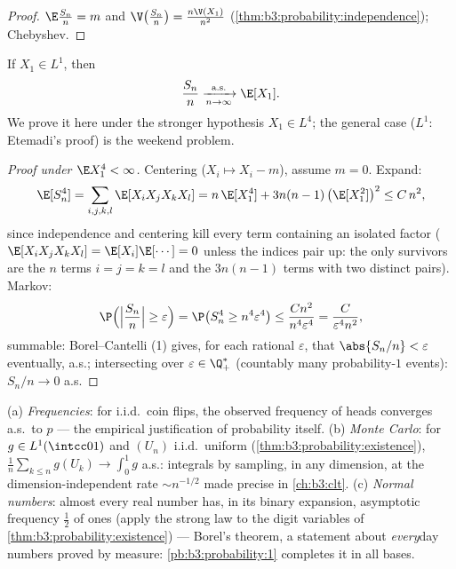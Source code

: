 \begin{proof}
$\E\frac{S_n}n = m$ and $\V\bigl(\frac{S_n}n\bigr) =
\frac{n\V(X_1)}{n^2}$
(\cref{thm:b3:probability:independence}); Chebyshev.
\end{proof}

\begin{theorem}
\label{thm:b3:probability:slln}
If $X_1 \in L^1$, then
\[
\frac{S_n}{n} \xrightarrow[n\to\infty]{\text{a.s.}} \E[X_1].
\]
We prove it here under the stronger hypothesis $X_1 \in
L^4$; the general case ($L^1$: Etemadi's proof) is the
weekend problem.
\end{theorem}

\begin{proof}[Proof under $\E X_1^4 < \infty$]
Centering ($X_i \mapsto X_i - m$), assume $m = 0$. Expand:
\[
\E[S_n^4] = \sum_{i,j,k,l}\E[X_iX_jX_kX_l]
= n\,\E[X_1^4] + 3n(n-1)\,\bigl(\E[X_1^2]\bigr)^2 \leq
C\,n^2 ,
\]
since independence and centering kill every term containing
an isolated factor ($\E[X_iX_jX_kX_l] =
\E[X_i]\E[\cdots] = 0$ unless the indices pair up: the only
survivors are the $n$ terms $i=j=k=l$ and the $3n(n-1)$
terms with two distinct pairs). Markov:
\[
\P\Bigl(\Bigl|\frac{S_n}n\Bigr| \geq \varepsilon\Bigr)
= \P\bigl(S_n^4 \geq n^4\varepsilon^4\bigr)
\leq \frac{Cn^2}{n^4\varepsilon^4} =
\frac{C}{\varepsilon^4n^2},
\]
summable: Borel--Cantelli (1) gives, for each rational
$\varepsilon$, that $\abs{S_n/n} < \varepsilon$ eventually,
a.s.; intersecting over $\varepsilon \in \Q_+^*$ (countably
many probability-$1$ events): $S_n/n \to 0$ a.s.
\end{proof}

\begin{example}
\label{ex:b3:probability:sllnapps}
(a) \emph{Frequencies}: for i.i.d.\ coin flips, the observed
frequency of heads converges a.s.\ to $p$ --- the empirical
justification of probability itself.
(b) \emph{Monte Carlo}: for $g \in
L^1(\intcc01)$ and $(U_n)$ i.i.d.\ uniform
(\cref{thm:b3:probability:existence}),
$\frac1n\sum_{k\leq n}g(U_k) \to \int_0^1g$ a.s.: integrals
by sampling, in any dimension, at the dimension-independent
rate $\sim n^{-1/2}$ made precise in \cref{ch:b3:clt}.
(c) \emph{Normal numbers}: almost every real number has, in
its binary expansion, asymptotic frequency $\frac12$ of ones
(apply the strong law to the digit variables of
\cref{thm:b3:probability:existence}) --- Borel's theorem, a
statement about \emph{every}day numbers proved by measure:
\cref{pb:b3:probability:1} completes it in all bases.
\end{example}

